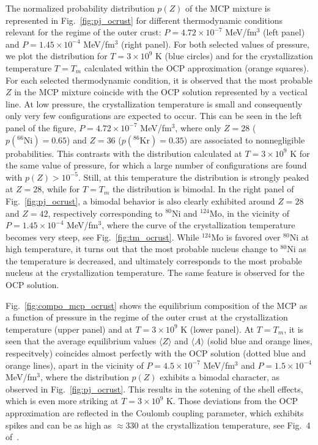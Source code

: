 The normalized probability distribution $p(Z)$ of the MCP mixture is 
represented in Fig.~\ref{fig:pj_ocrust} for different thermodynamic conditions 
relevant for the regime of the outer crust: $P = 4.72\times 10^{-7}$ MeV/fm$^3$
(left panel) and $P=1.45\times 10^{-4}$ MeV/fm$^3$ (right panel). For both 
selected values of pressure, we plot the distribution for $T=3\times
10^9$ K (blue circles) and for the crystallization temperature $T=T_m$ 
calculated within the OCP approximation (orange squares).
For each selected thermodynamic condition, it is observed that the most
probable $Z$ in the MCP mixture coincide with the OCP solution represented by 
a vectical line.
At low pressure, the crystallization temperature is small and consequently only 
very few configurations are expected to occur. This can be seen in the left
panel of the figure, $P = 4.72\times 10^{-7}$ MeV/fm$^3$, where only $Z=28$
($p(^{66}\text{Ni}) = 0.65$) and $Z=36$ ($p(^{86}\text{Kr})=0.35$) are 
associated to nonnegligible probabilities. This contrasts with the 
distribution calculated 
at $T=3\times 10^9$ K for the same value of pressure, for which a large number 
of configurations are found with $p(Z) > 10^{-5}$. Still, at this temperature 
the distribution is strongly peaked at $Z=28$, while for $T=T_m$ the 
distribution is bimodal. 
In the right panel of Fig.~\ref{fig:pj_ocrust}, a bimodal behavior is also 
clearly exhibited around $Z=28$ and $Z=42$, respectively corresponding to 
$^{80}$Ni and $^{124}$Mo, in the vicinity of $P = 1.45\times 10^{-4}$ 
MeV/fm$^3$, where the curve of the crystallization temperature becomes very 
steep, see Fig.~\ref{fig:tm_ocrust}. 
While $^{124}$Mo is favored over $^{80}$Ni at high temperature,
it turns out that the most probable nucleus change to $^{80}$Ni as the
temperature is decreased, and ultimately corresponds to the most probable
nucleus at the crystallization temperature. The same feature is observed for 
the OCP solution.

Fig.~\ref{fig:compo_mcp_ocrust} shows the equilibrium composition of the MCP as
a function of pressure in the regime of the outer crust at the crystallization
temperature (upper panel) and at $T=3\times 10^9$ K (lower panel). At $T=T_m$, 
it is seen that the average equilibrium values $\langle Z\rangle$ and $\langle
A\rangle$ (solid blue and orange lines, respecitvely) coincides almost 
perfectly with the OCP solution (dotted blue and orange lines), apart in the
vicinity of $P=4.5\times 10^{-7}$ MeV/fm$^3$ and $P=1.5\times 10^{-4}$
MeV/fm$^3$, where the distribution $p(Z)$ exhibits a bimodal character, as
observed in Fig.~\ref{fig:pj_ocrust}. This results in the sotening of the shell 
effects, which is even more striking at $T=3\times 10^9$ K. Those deviations 
from the OCP approximation are reflected in the Coulomb coupling parameter, 
which exhibits spikes and can be as high as $\approx 330$ at the
crystallization temperature, see Fig.~4 of~\cite{Fantina2020}.

